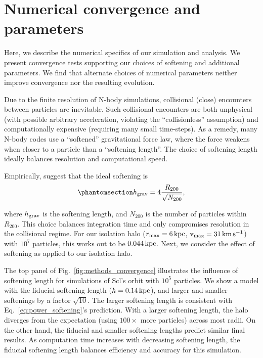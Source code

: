 \chapter{Numerical convergence and
parameters}\label{sec:extra_convergence}

Here, we describe the numerical specifics of our simulation and
analysis. We present convergence tests supporting our choices of
softening and additional parameters. We find that alternate choices of
numerical parameters neither improve convergence nor the resulting
evolution.

Due to the finite resolution of N-body simulations, collisional (close)
encounters between particles are inevitable. Such collisional encounters
are both unphysical (with possible arbitrary acceleration, violating the
``collisionless'' assumption) and computationally expensive (requiring
many small time-steps). As a remedy, many N-body codes use a
``softened'' gravitational force law, where the force weakens when
closer to a particle than a ``softening length''. The choice of
softening length ideally balances resolution and computational speed.

Empirically, \citet{power+2003} suggest that the ideal softening is
\begin{equation}\protect\phantomsection\label{eq:power_softening}{
h_{\rm grav} = 4 \frac{R_{200}}{\sqrt{N_{200}}},
}\end{equation}

where \(h_{\rm grav}\) is the softening length, and \(N_{200}\) is the
number of particles within \(R_{200}\). This choice balances integration
time and only compromises resolution in the collisional regime. For our
isolation halo (\(r_{\rm max}=6\,{\rm kpc}\), \({\rm v}_{\rm max}=31\,{\rm km\,s^{-1}}\)) with \(10^7\)
particles, this works out to be \(0.044\,{\rm kpc}\). Next, we consider
the effect of softening as applied to our isolation halo.

The top panel of Fig.~\ref{fig:methods_convergence} illustrates the
influence of softening length for simulations of Scl's \smallperi{}
orbit with \(10^5\) particles. We show a model with the fiducial
softening length (\(h=0.14\,{\rm kpc}\)), and larger and smaller softenings
by a factor \(\sqrt{10}\). The larger softening length is consistent
with Eq.~\ref{eq:power_softening}'s prediction. With a larger softening
length, the halo diverges from the expectation (using \(100\times\) more
particles) across most radii. On the other hand, the fiducial and
smaller softening lengths predict similar final results. As computation
time increases with decreasing softening length, the fiducial softening
length balances efficiency and accuracy for this simulation.

